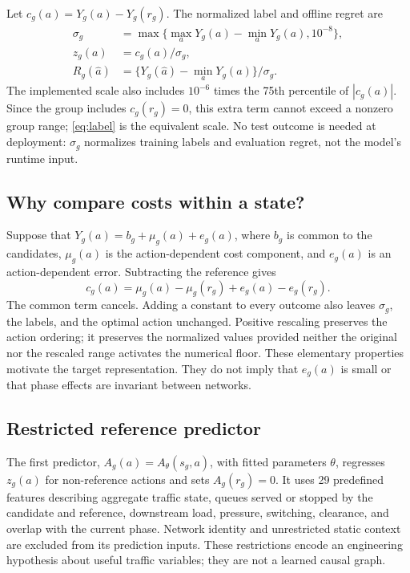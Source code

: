 Let $c_g(a)=Y_g(a)-Y_g(r_g)$. The normalized label and offline regret are
\begin{align}
 \sigma_g&=\max\{\max_aY_g(a)-\min_aY_g(a),10^{-8}\},\nonumber\\
 z_g(a)&=c_g(a)/\sigma_g,\label{eq:label}\\
 R_g(\widehat a)&=\{Y_g(\widehat a)-\min_aY_g(a)\}/\sigma_g.
 \label{eq:regret}
\end{align}
The implemented scale also includes $10^{-6}$ times the 75th percentile of $|c_g(a)|$. Since the group includes $c_g(r_g)=0$, this extra term cannot exceed a nonzero group range; \eqref{eq:label} is the equivalent scale. No test outcome is needed at deployment: $\sigma_g$ normalizes training labels and evaluation regret, not the model's runtime input.

\subsection{Why compare costs within a state?}
Suppose that $Y_g(a)=b_g+\mu_g(a)+e_g(a)$, where $b_g$ is common to the candidates, $\mu_g(a)$ is the action-dependent cost component, and $e_g(a)$ is an action-dependent error. Subtracting the reference gives
\begin{equation}
 c_g(a)=\mu_g(a)-\mu_g(r_g)+e_g(a)-e_g(r_g).
 \label{eq:cancellation}
\end{equation}
The common term cancels. Adding a constant to every outcome also leaves $\sigma_g$, the labels, and the optimal action unchanged. Positive rescaling preserves the action ordering; it preserves the normalized values provided neither the original nor the rescaled range activates the numerical floor. These elementary properties motivate the target representation. They do not imply that $e_g(a)$ is small or that phase effects are invariant between networks.

\subsection{Restricted reference predictor}
The first predictor, $A_g(a)=A_\theta(s_g,a)$, with fitted parameters $\theta$, regresses $z_g(a)$ for non-reference actions and sets $A_g(r_g)=0$. It uses 29 predefined features describing aggregate traffic state, queues served or stopped by the candidate and reference, downstream load, pressure, switching, clearance, and overlap with the current phase. Network identity and unrestricted static context are excluded from its prediction inputs. These restrictions encode an engineering hypothesis about useful traffic variables; they are not a learned causal graph.


